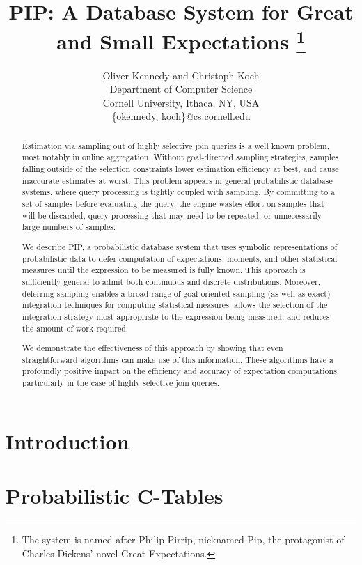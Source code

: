 \documentclass{vldb}
\title{PIP: A Database System for Great and Small Expectations%
\thanks{The
system is named after Philip Pirrip, nicknamed Pip, the protagonist of
Charles Dickens' novel Great Expectations.}}
\author{Oliver Kennedy and Christoph Koch\\
Department of Computer Science \\
Cornell University, Ithaca, NY, USA \\
\{okennedy, koch\}@cs.cornell.edu}
\date{}
\begin{document}


\maketitle



\begin{abstract}
Estimation via sampling out of highly selective join queries is a well known problem, most notably in online aggregation.  Without goal-directed sampling strategies, samples falling outside of the selection constraints lower estimation efficiency at best, and cause inaccurate estimates at worst.  This problem appears in general probabilistic database systems, where query processing is tightly coupled with sampling.  By committing to a set of samples before evaluating the query, the engine wastes effort on samples that will be discarded, query processing that may need to be repeated, or unnecessarily large numbers of samples.  

We describe PIP, a probabilistic database system that uses symbolic representations of probabilistic data to defer computation of expectations, moments, and other statistical measures until the expression to be measured is fully known.  This approach is sufficiently general to admit both continuous and discrete distributions.  Moreover, deferring sampling enables a broad range of goal-oriented sampling (as well as exact) integration techniques for computing statistical measures, allows the selection of the integration strategy most appropriate to the expression being measured, and reduces the amount of work required.  

We demonstrate the effectiveness of this approach by showing that even straightforward algorithms can make use of this information.  These algorithms have a profoundly positive impact on the efficiency and accuracy of expectation computations, particularly in the case of highly selective join queries.
\end{abstract}



\section{Introduction}
\label{sec:introduction}


\section{Probabilistic C-Tables}
\label{sec:background}

\end{document}
